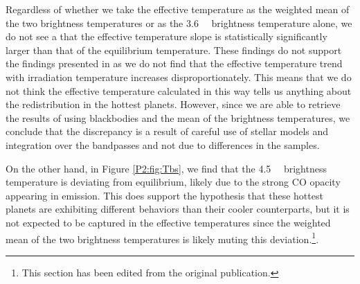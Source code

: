\begin{subappendices}
Regardless of whether we take the effective temperature as the weighted mean of the two brightness temperatures or as the 3.6~\um~ brightness temperature alone, we do not see a that the effective temperature slope is statistically significantly larger than that of the equilibrium temperature. These findings do not support the findings presented in \citet{Schwartz2015} as we do not find that the effective temperature trend with irradiation temperature increases disproportionately. This means that we do not think the effective temperature calculated in this way tells us anything about the redistribution in the hottest planets. However, since we are able to retrieve the results of \citet{Schwartz2015} using blackbodies and the mean of the brightness temperatures, we conclude that the discrepancy is a result of careful use of stellar models and integration over the bandpasses and not due to differences in the samples.

On the other hand, in Figure \ref{P2:fig:Tbs}, we find that the 4.5~\um~ brightness temperature is deviating from equilibrium, likely due to the strong CO opacity appearing in emission. This does support the hypothesis that these hottest planets are exhibiting different behaviors than their cooler counterparts, but it is not expected to be captured in the effective temperatures since the weighted mean of the two brightness temperatures is likely muting this deviation.\footnote{This section has been edited from the original publication.}.


\end{subappendices}
